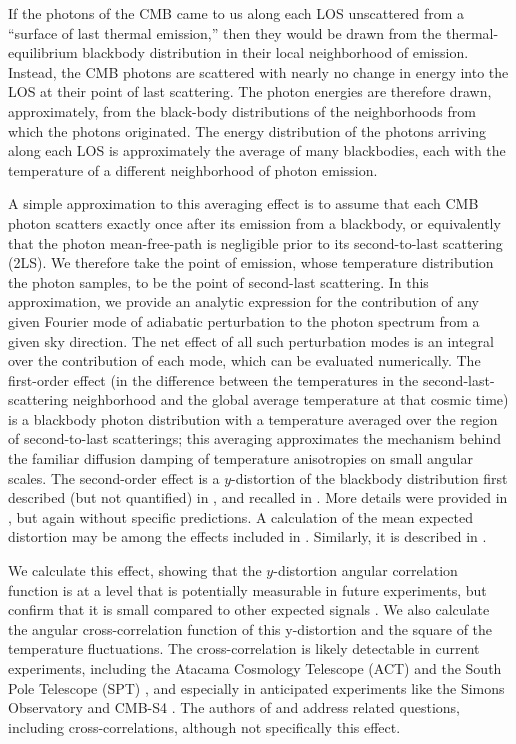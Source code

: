 \documentclass[fleqn,usenatbib]{mnras}
\begin{document}
    If the photons of the CMB came to us along each LOS unscattered from a
    ``surface of last thermal emission,'' then they would be drawn from the
    thermal-equilibrium blackbody distribution in their local neighborhood of
    emission.  Instead, the CMB photons are scattered with nearly no change in
    energy into the LOS at their point of last scattering.  The photon energies
    are therefore drawn, approximately, from the black-body distributions of the
    neighborhoods from which the photons originated.  The energy distribution of
    the photons arriving along each LOS is approximately the average of many
    blackbodies, each with the temperature of a different neighborhood of photon
    emission.

    A simple approximation to this averaging effect is to assume that each CMB
    photon scatters exactly once after its emission from a blackbody, or
    equivalently that the photon mean-free-path is negligible prior to its
    second-to-last scattering (2LS).  We therefore take the point of emission,
    whose temperature distribution the photon samples, to be the point of
    second-last scattering.  In this approximation, we provide an analytic
    expression for the contribution of any given Fourier mode of adiabatic
    perturbation to the photon spectrum from a given sky direction.  The net
    effect of all such perturbation modes is an integral over the contribution
    of each mode, which can be evaluated numerically.  The first-order effect
    (in the difference between the temperatures in the second-last-scattering
    neighborhood and the global average temperature at that cosmic time) is a
    blackbody photon distribution with a temperature averaged over the region of
    second-to-last scatterings; this averaging approximates the mechanism behind
    the familiar diffusion damping of temperature anisotropies on small angular
    scales.  The second-order effect is a  $y$-distortion of the blackbody
    distribution first described (but not quantified) in \citep{Zeldovich+1972},
    and recalled in \citep{ChlubaSunyaev2004}.  More details were provided in
    \citep{Khatri+2012}, but again without specific predictions.  A calculation
    of the mean expected distortion may be among the effects included in
    \citep{Chluba+2012}.  Similarly, it is described in
    \citep{SunyaevKhatri2013,Chluba2016}.

    We calculate this effect, showing that the $y$-distortion angular
    correlation function is at a level that is potentially measurable in future
    experiments, but confirm that it is small compared to other expected signals
    \citep{ChlubaSunyaev2004}.  We also calculate the angular cross-correlation
    function of this y-distortion and the square of the temperature
    fluctuations.  The cross-correlation is likely detectable in current
    experiments, including the Atacama Cosmology Telescope (ACT)
    \citep{Coulton+2023} and the South Pole Telescope (SPT) \citep{SPTymap}, and
    especially in anticipated experiments like the Simons Observatory
    \citep{Galitzki+2018} and CMB-S4 \citep{Abitbol+2017}.  The authors of
    \citep{Chluba+2022} and \citep{Kite+2022} address related questions,
    including cross-correlations, although not specifically this effect.
\end{document}

